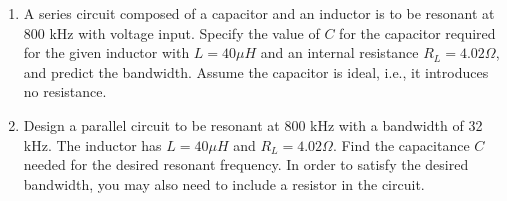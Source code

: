 \begin{enumerate}

\item A series circuit composed of a capacitor and an inductor is to be 
  resonant at 800 kHz with voltage input. Specify the value of $C$ for the 
  capacitor required for the given inductor with $L=40\mu H$ and an internal 
  resistance $R_L=4.02\Omega$, and predict the bandwidth. Assume the capacitor 
  is ideal, i.e., it introduces no resistance.


\item Design a parallel circuit to be resonant at 800 kHz with a bandwidth
  of 32 kHz. The inductor has $L=40 \mu H$ and $R_L=4.02 \Omega$. Find the
  capacitance $C$ needed for the desired resonant frequency. In order to 
  satisfy the desired bandwidth, you may also need to include a resistor in 
  the circuit. 



\end{enumerate}
